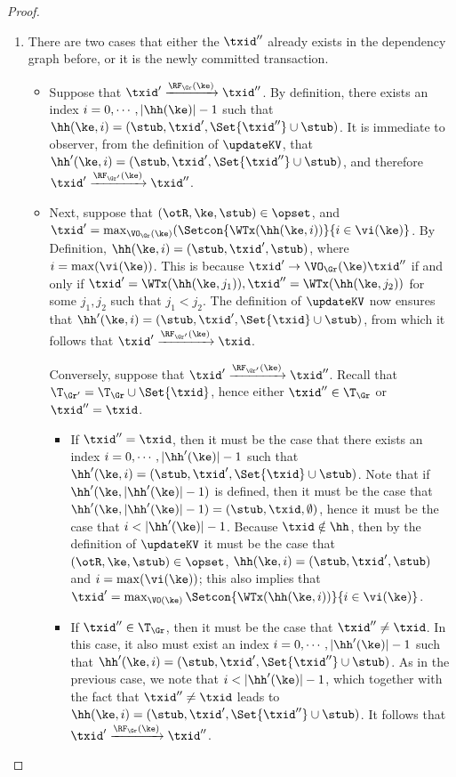 \begin{proof}
\begin{enumerate}
\item There are two cases that either the \( \txid'' \) already exists in the dependency graph before,
or it is the newly committed transaction.
\begin{itemize}
\item Suppose that $\txid' \xrightarrow{\RF_{\Gr}(\ke)} \txid''$. 
By definition, there exists an index $i = 0,\cdots, \lvert \hh(\ke) \rvert - 1$ 
such that $\hh(\ke, i) = (\stub, \txid', \Set{\txid''} \cup \stub)$. It is immediate 
to observer, from the definition of $\updateKV$, that $\hh'(\ke, i) = (\stub, \txid', \Set{\txid''} \cup \stub)$, 
and therefore $\txid' \xrightarrow{\RF_{\Gr'}(\ke)} \txid''$. 

\item Next, suppose that $(\otR, \ke, \stub) \in \opset$, and $\txid' = \max_{\VO_{\Gr}(\ke)}(\Setcon{\WTx(\hh(\ke, i)) }{ i \in \vi(\ke)}$. 
By Definition, $\hh(\ke, i) = (\stub, \txid', \stub)$, where $i = \max(\vi(\ke))$. This is because 
$\txid' \rightarrow{\VO_{\Gr}(\ke)} \txid''$ if and only if $\txid' = \WTx(\hh(\ke, j_1)), \txid'' = 
\WTx(\hh(\ke, j_2))$ for some $j_1, j_2$ such that $j_1 < j_2$. 
The definition of $\updateKV$ now ensures that $\hh'(\ke, i) = (\stub, \txid', \Set{\txid } \cup \stub)$, 
from which it follows that $\txid' \xrightarrow{\RF_{\Gr'}(\ke)} \txid$.

Conversely, suppose that $\txid' \xrightarrow{\RF_{\Gr'}(\ke)} \txid''$. 
Recall that $\T_{\Gr'} = \T_{\Gr} \cup \Set{ \txid }$, hence either 
$\txid'' \in \T_{\Gr}$ or $\txid'' = \txid$. 

\begin{itemize}
\item If $\txid'' = \txid$, then it must be the case that there exists an index $i = 0,\cdots, \lvert \hh'(\ke) \rvert - 1$ 
such that $\hh'(\ke, i) = (\stub, \txid', \Set{\txid } \cup \stub)$. Note that if $\hh'(\ke, \lvert \hh'(\ke) \rvert -1)$ is 
defined, then it must be the case that $\hh'(\ke, \lvert \hh'(\ke) \rvert -1) = (\stub, \txid, \emptyset)$, 
hence it must be the case that $i < \lvert \hh'(\ke) \rvert - 1$. Because $\txid \notin \hh$, 
then by the definition of $\updateKV$ it must be the case that $(\otR, \ke, \stub) \in \opset$, 
$\hh(\ke, i) = (\stub, \txid', \stub)$ and $i = \max(\vi(\ke))$; this also implies that $\txid' = 
\max_{\VO(\ke)}\Setcon{\WTx(\hh(\ke, i)) }{ i \in \vi(\ke)}$. 

\item If $\txid'' \in \T_{\Gr}$, then  it must be the case that $\txid'' \neq \txid$. 
In this case, it also must exist an index $i = 0,\cdots, \lvert \hh'(\ke) \rvert - 1$ 
such that $\hh'(\ke, i) = (\stub, \txid', \Set{\txid''} \cup \stub)$. As in the previous 
case, we note that $i < \lvert \hh'(\ke) \rvert - 1$, which together 
with the fact that $\txid'' \neq \txid$ leads to $\hh(\ke, i) = (\stub, \txid', \Set{\txid''} \cup \stub)$. 
It follows that $\txid' \xrightarrow{\RF_{\Gr}(\ke)} \txid''$.
\end{itemize}
\end{itemize}


\end{enumerate}
\end{proof}
